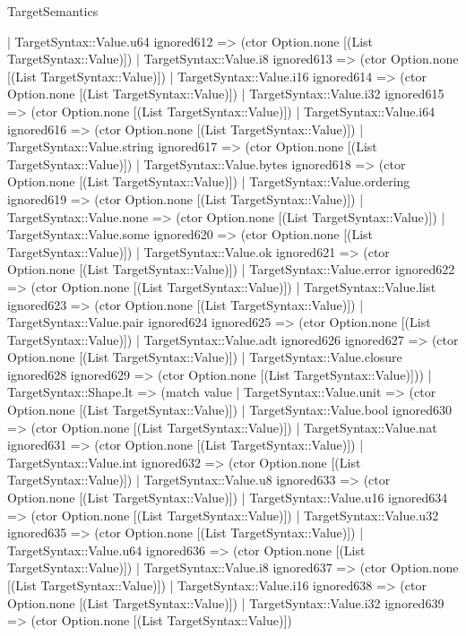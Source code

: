 \begin{lexlean}{TargetSemantics}
\begin{semanticmodule}
{      | TargetSyntax::Value.u64 ignored612 => (ctor Option.none [(List TargetSyntax::Value)])
      | TargetSyntax::Value.i8 ignored613 => (ctor Option.none [(List TargetSyntax::Value)])
      | TargetSyntax::Value.i16 ignored614 => (ctor Option.none [(List TargetSyntax::Value)])
      | TargetSyntax::Value.i32 ignored615 => (ctor Option.none [(List TargetSyntax::Value)])
      | TargetSyntax::Value.i64 ignored616 => (ctor Option.none [(List TargetSyntax::Value)])
      | TargetSyntax::Value.string ignored617 => (ctor Option.none [(List TargetSyntax::Value)])
      | TargetSyntax::Value.bytes ignored618 => (ctor Option.none [(List TargetSyntax::Value)])
      | TargetSyntax::Value.ordering ignored619 => (ctor Option.none [(List TargetSyntax::Value)])
      | TargetSyntax::Value.none => (ctor Option.none [(List TargetSyntax::Value)])
      | TargetSyntax::Value.some ignored620 => (ctor Option.none [(List TargetSyntax::Value)])
      | TargetSyntax::Value.ok ignored621 => (ctor Option.none [(List TargetSyntax::Value)])
      | TargetSyntax::Value.error ignored622 => (ctor Option.none [(List TargetSyntax::Value)])
      | TargetSyntax::Value.list ignored623 => (ctor Option.none [(List TargetSyntax::Value)])
      | TargetSyntax::Value.pair ignored624 ignored625 => (ctor Option.none [(List TargetSyntax::Value)])
      | TargetSyntax::Value.adt ignored626 ignored627 => (ctor Option.none [(List TargetSyntax::Value)])
      | TargetSyntax::Value.closure ignored628 ignored629 => (ctor Option.none [(List TargetSyntax::Value)]))
    | TargetSyntax::Shape.lt => (match value
      | TargetSyntax::Value.unit => (ctor Option.none [(List TargetSyntax::Value)])
      | TargetSyntax::Value.bool ignored630 => (ctor Option.none [(List TargetSyntax::Value)])
      | TargetSyntax::Value.nat ignored631 => (ctor Option.none [(List TargetSyntax::Value)])
      | TargetSyntax::Value.int ignored632 => (ctor Option.none [(List TargetSyntax::Value)])
      | TargetSyntax::Value.u8 ignored633 => (ctor Option.none [(List TargetSyntax::Value)])
      | TargetSyntax::Value.u16 ignored634 => (ctor Option.none [(List TargetSyntax::Value)])
      | TargetSyntax::Value.u32 ignored635 => (ctor Option.none [(List TargetSyntax::Value)])
      | TargetSyntax::Value.u64 ignored636 => (ctor Option.none [(List TargetSyntax::Value)])
      | TargetSyntax::Value.i8 ignored637 => (ctor Option.none [(List TargetSyntax::Value)])
      | TargetSyntax::Value.i16 ignored638 => (ctor Option.none [(List TargetSyntax::Value)])
      | TargetSyntax::Value.i32 ignored639 => (ctor Option.none [(List TargetSyntax::Value)])
}
\end{semanticmodule}
\end{lexlean}
